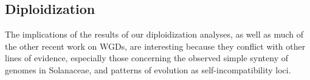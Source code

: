 \subsection*{Diploidization}


The implications of the results of our diploidization analyses, as well as much of the other recent work on WGDs, are interesting because they conflict with other lines of evidence, especially those concerning the observed simple synteny of genomes in Solanaceae, and patterns of evolution as self-incompatibility loci.


